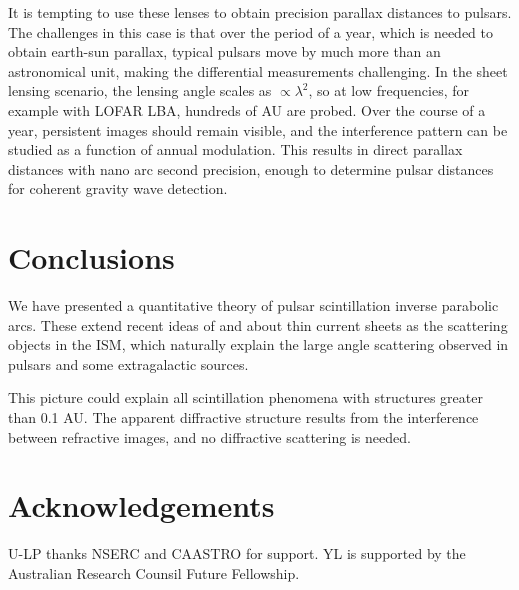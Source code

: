 \documentclass[useAMS,usenatbib]{mn2e}
\begin{document}
It is tempting to use these lenses to obtain precision parallax
distances to pulsars.  The challenges in this case is that over the
period of a year, which is needed to obtain earth-sun parallax,
typical pulsars move by much more than an astronomical unit, making
the differential measurements challenging.  In the sheet lensing
scenario, the lensing angle scales as $\propto \lambda^2$, so at low
frequencies, for example with LOFAR LBA, hundreds of AU are probed.
Over the course of a year, persistent images should remain visible, and the
interference pattern can be studied as a function of annual
modulation.  This results in direct parallax distances with nano arc
second precision, enough to determine pulsar distances for coherent
gravity wave detection.

\section{Conclusions}

We have presented a quantitative theory of pulsar scintillation
inverse parabolic arcs.  These extend recent ideas of
\citet{2006ApJ...640L.159G} and \citet{2012MNRAS.421L.132P} about thin
current sheets as the scattering objects in the ISM, which naturally
explain the large angle scattering observed in pulsars and some
extragalactic sources.

This picture could explain all scintillation phenomena with structures
greater than 0.1 AU.  The apparent diffractive structure results from
the interference between refractive images, and no diffractive
scattering is needed.

\section{Acknowledgements}

U-LP thanks NSERC and CAASTRO for support. YL is supported 
by the Australian Research Counsil Future Fellowship.
\end{document}
